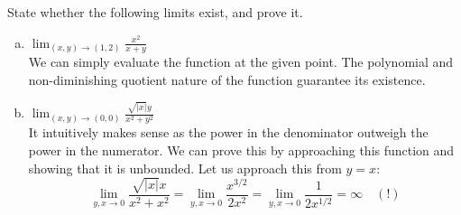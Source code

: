  State whether the following limits exist, and prove it.
\begin{enumerate}[a.]
  \item $\displaystyle \lim_{(x,y)\rightarrow (1,2)} \frac{x^2}{x+y}$\\
   We can simply evaluate the function at the given point. The polynomial and non-diminishing quotient nature of the function guarantee its existence. 
  
  \item $\displaystyle \lim_{(x,y)\rightarrow (0,0)} \frac{\sqrt{|x|}y}{x^2+y^2}$\\
   It intuitively makes sense as the power in the denominator outweigh the power in the numerator. We can prove this by approaching this function and showing that it is unbounded. Let us approach this from $y=x$: 
  \[\lim_{y,x\to 0}\frac{\sqrt{|x|}x}{x^2+x^2}=\lim_{y,x\to 0}\frac{x^{3/2}}{2x^2}=\lim_{y,x\to 0}\frac{1}{2x^{1/2}}=\infty\quad (!)\]

\end{enumerate}
